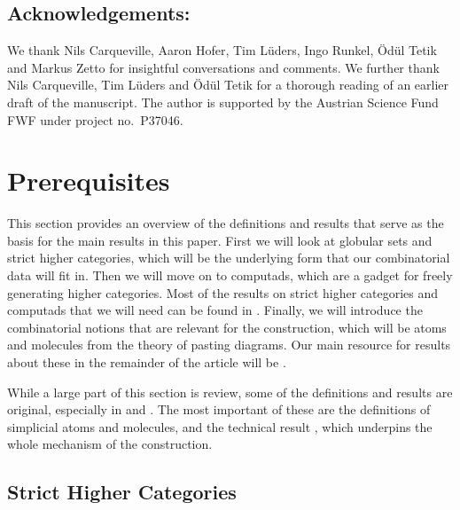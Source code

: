 \documentclass[12pt,a4paper]{article}
\numberwithin{equation}{section}
\begin{document}
\subsection*{Acknowledgements:}

We thank Nils Carqueville, Aaron Hofer, Tim L\"uders, Ingo Runkel, \"Od\"ul Tetik and Markus Zetto for insightful conversations and comments. We further thank Nils Carqueville, Tim L\"uders and \"Od\"ul Tetik for a thorough reading of an earlier draft of the manuscript. The author is supported by the Austrian Science Fund FWF under project no.\ P37046.

\section{Prerequisites}\label{sec:prerequisites}

This section provides an overview of the definitions and results that serve as the basis for the main results in this paper. First we will look at globular sets and strict higher categories, which will be the underlying form that our combinatorial data will fit in. Then we will move on to computads, which are a gadget for freely generating higher categories. Most of the results on strict higher categories and computads that we will need can be found in \cite{ara}. Finally, we will introduce the combinatorial notions that are relevant for the construction, which will be atoms and molecules from the theory of pasting diagrams. Our main resource for results about these in the remainder of the article will be \cite{hadzihasanovic}.

While a large part of this section is review, some of the definitions and results are original, especially in  and . The most important of these are the definitions of simplicial atoms and molecules, and the technical result , which underpins the whole mechanism of the construction.

\setcounter{subsection}{-1}
\subsection{Strict Higher Categories}\label{ssec:higher_categories}
\end{document}
